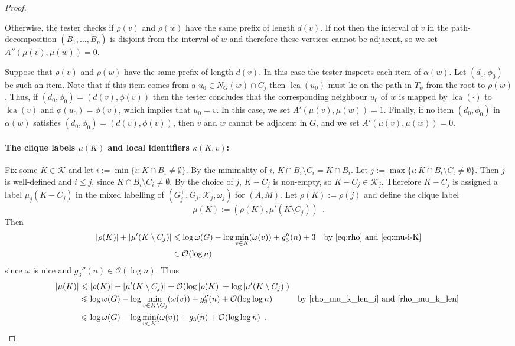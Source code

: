 \documentclass{patmorin}
\renewcommand{\le}{\leqslant}
\DeclareMathOperator{\lca}{lca}
\newcommand{\Oh}{\calO}
\let\eqref\cref
\newcommand{\calK}{\mathcal{K}}
\newcommand{\calO}{\mathcal{O}}
\begin{document}
\begin{proof}
\begin{itemize}
       Otherwise, the tester checks if $\rho(v)$ and $\rho(w)$ have the same prefix of length $d(v)$. 
       If not then the interval of $v$ in the path-decomposition $(B_1,\ldots,B_p)$ is disjoint from the interval of $w$ and therefore these vertices cannot be adjacent, so we set $A''(\mu(v),\mu(w))=0$. 
       
       Suppose that $\rho(v)$ and $\rho(w)$ have the same prefix of length $d(v)$. 
       In this case the tester inspects each item of $\alpha(w)$. Let $(d_0,\phi_0)$ be such an item. Note that if this item comes from a $u_0\in N_G(w)\cap C_j$ then 
       $\lca(u_0)$ must lie on the path in $T_{\psi}$ from the root to $\rho(w)$. 
       Thus, if $(d_0,\phi_0)=(d(v),\phi(v))$ then the tester concludes that the corresponding neighbour $u_0$ of $w$ is mapped by $\lca(\cdot)$ to $\lca(v)$ and $\phi(u_0)=\phi(v)$, which implies that $u_0=v$. In this case, we set $A'(\mu(v),\mu(w))=1$. 
       Finally, if no item $(d_0,\phi_0)$ in $\alpha(w)$ satisfies $(d_0,\phi_0)=(d(v),\phi(v))$, then $v$ and $w$ cannot be adjacent in $G$, and we set $A'(\mu(v),\mu(w))=0$. 
     \end{itemize}



    \paragraph{\boldmath The clique labels $\mu(K)$ and local identifiers $\kappa(K,v)$:}
    Fix some $K\in\calK$ and let $i:=\min\{\iota:K\cap B_\iota\neq\emptyset\}$.
    By the minimality of $i$, $K\cap B_i\setminus C_i=K\cap B_i$. Let $j:=\max\{\iota:K\cap B_\iota\setminus C_\iota\neq\emptyset\}$.
    Then $j$ is well-defined and $i\le j$, since $K\cap B_i\setminus C_i\neq\emptyset$.
    By the choice of $j$, $K-C_j$ is non-empty, so $K-C_j\in\calK_j$.
    Therefore $K-C_j$ is assigned a label $\mu_j(K-C_j)$ in the mixed labelling of $(G^+_j,G_j,\calK_j,\omega_j)$ for $(A,M)$.
    Let $\rho(K):=\rho(j)$ and define the clique label
    \[
        \mu(K):=(\rho(K),\mu'(K\setminus C_j)) \enspace .
    \]
    Then
    \begin{align}
       |\rho(K)|+|\mu'(K\setminus C_j)| 
       & \le \log\omega(G)-\log\min_{v\in K}(\omega(v))+g_3''(n)+3&&\textrm{by~\eqref{eq:rho} and~\eqref{eq:mu-i-K}}  \label{rho_mu_k_len_i} \\
       & \in \Oh(\log n)
       \label{rho_mu_k_len}
    \end{align}
    since $\omega$ is nice and $g_3''(n)\in\Oh(\log n)$.  Thus 
    \begin{align*}
        |\mu(K)|
        & \le |\rho(K)|+|\mu'(K\setminus C_j)| + \Oh(\log|\rho(K)|+\log|\mu'(K\setminus C_j)|) \\
        & \le \log\omega(G)-\log\min_{v\in K\setminus C_j}(\omega(v)) + g''_3(n)+\Oh(\log\log n) & \text{by \eqref{rho_mu_k_len_i} and \eqref{rho_mu_k_len} } \\
        & \le \log\omega(G)-\log\min_{v\in K}(\omega(v)) + g_3(n)+\Oh(\log\log n) \enspace .
    \end{align*}


\end{proof}
\end{document}
